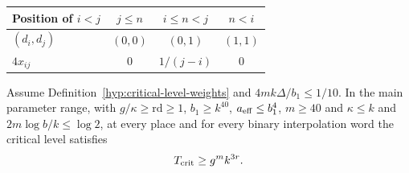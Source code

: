 \begin{construction}
\begin{tabular}{@{}lccc@{}}\toprule
Position of \(i<j\) & \(j\le n\) & \(i\le n<j\) & \(n<i\)\\\midrule
\((d_i,d_j)\) & \((0,0)\) & \((0,1)\) & \((1,1)\)\\
\(4x_{ij}\) & \(0\) & \(1/(j-i)\) & \(0\)\\\bottomrule
\end{tabular}
\caption{The binary word maximizing the linear term of the Vandermonde perturbation, with \(n=\lfloor J/2\rfloor\). Only pairs crossing the midpoint contribute. The quadratic remainder is bounded uniformly for all words.}\label{fig:vandermonde-crossing-pairs}
\end{construction}

\begin{proposition}\label{prop:critical-level-lower}
Assume Definition~\ref{hyp:critical-level-weights} and
\(4mk\Delta/b_1\le 1/10\).
In the main parameter range, with \(g/\kappa\ge\mathrm{rd}\ge1\),
\(b_1\ge k^{40}\), \(a_{\rm eff}\le b_1^4\), \(m\ge40\) and
\(\kappa\le k\) and \(2m\log b/k\le\log 2\), at every place and for every binary interpolation word the critical level satisfies 
\[
 T_{\rm crit}\ge g^m k^{3r}.
\]

\end{proposition}

